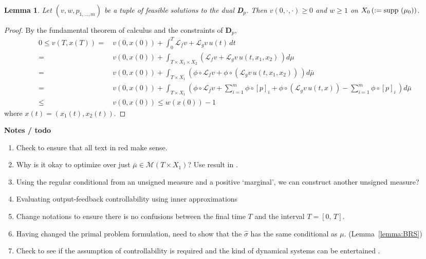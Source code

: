 \documentclass[dvipsnames]{article}
\newtheorem{lemma}{Lemma}
\providecommand{\supp}{\ensuremath \text{supp }}
\begin{document}
\begin{lemma}
Let $(v,w,p_{1,\ldots,m})$ be a tuple of feasible solutions to the dual {\bf D$_p$}. Then $v(0,\cdot,\cdot)\ge 0$ and $w\ge 1$ on $X_0\,(:=\supp (\mu_0))$.
\end{lemma}
\begin{proof}
    By the fundamental theorem of calculus and the constraints of {\bf D$_p$},
    \begin{align*}
      0\le v(T,x(T))=&\,v(0,x(0))+\int_{0}^T \mathcal L_fv+\mathcal L_gv\,u(t)\, dt\\
      =&\,v(0,x(0))+\int_{T\times X_1\times X_2} \left(\mathcal L_fv+\mathcal L_gv\,u(t,x_1,x_2)\, \right)d\mu\\
      =&\,v(0,x(0))+\int_{T\times X_1} \left(\phi\circ\mathcal L_fv+\phi \circ (\mathcal L_gv\,u(t,x_1,x_2))\,\right) d\bar\mu\\
      =&\,v(0,x(0))+\int_{T\times X_1} \left(\phi\circ\mathcal L_fv+\sum_{i=1}^m\phi\circ [p]_i+\phi \circ (\mathcal L_gv\,u(t,x))-\sum_{i=1}^m\phi\circ [p]_i\, \right)d\bar\mu\\
      \le&\,v(0,x(0))\le w(x(0))-1
    \end{align*}
    where $x(t)=(x_1(t),x_2(t))$.
\end{proof}
\begin{mybox_red}
{\bf Notes / todo}
\begin{enumerate}
    \item Check to ensure that all text in red make sense.
    \item Why is it okay to optimize over just $\bar\mu\in \mathcal M(T\times X_1)$? Use result in \cite[Theorem 10.7.2]{bogachev_v2}.
    \item Using the regular conditional from an unsigned measure and a positive `marginal', we can construct another unsigned measure?
    \item Evaluating output-feedback controllability using inner approximations
    \item Change notations to ensure there is no confusions between the final time $T$ and the interval $T=[0,\,T]$.
    \item Having changed the primal problem formulation, need to show that the $\hat\sigma$ has the same conditional as $\mu$. (Lemma~\ref{lemma:BRS})
    \item Check to see if the assumption of controllability is required and the kind of dynamical systems can be entertained \cite[Assumption 2]{Henrion}.
\end{enumerate}
\end{mybox_red}
\end{document}
